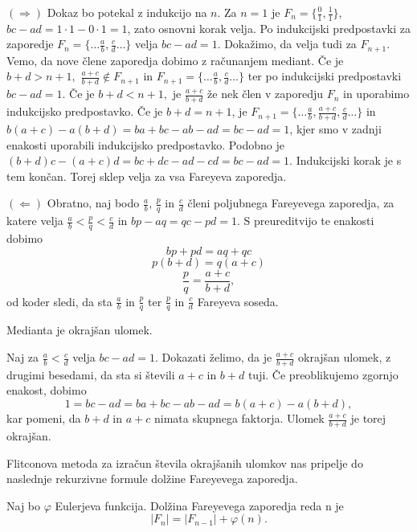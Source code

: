 \documentclass[mat1]{fmfdelo}
\begin{document}
\begin{dokaz}
$(\Rightarrow)$ Dokaz bo potekal z indukcijo na $n$.
Za $n=1$ je $F_n = \{\frac{0}{1}, \frac{1}{1}\}$, $bc - ad = 1\cdot1 - 0\cdot1 = 1$, zato osnovni korak velja.
Po indukcijski predpostavki za zaporedje \( F_n = \{\ldots \frac{a}{b}, \frac{c}{d} \ldots \} \) velja $bc - ad = 1$. Dokažimo, da velja tudi za $F_{n+1}$. Vemo, da nove člene zaporedja dobimo z računanjem mediant. Če je $b+d > n+1,$ $\frac{a+c}{b+d} \notin F_{n+1}$ in \( F_{n+1} = \{\ldots \frac{a}{b}, \frac{c}{d} \ldots \} \) ter po indukcijski predpostavki $bc - ad = 1$. 
Če je $b+d < n+1,$ je $\frac{a+c}{b+d}$ že nek člen v zaporedju $F_n$ in uporabimo indukcijsko predpostavko. 
Če je $b+d = n+1$, je \( F_{n+1} = \{\ldots \frac{a}{b}, \frac{a+c}{b+d}, \frac{c}{d} \ldots \} \) in $b(a + c) - a(b + d) = ba + bc - ab - ad = bc - ad = 1$, kjer smo v zadnji enakosti uporabili indukcijsko predpostavko. Podobno je $(b + d)c - (a + c)d = bc + dc - ad - cd = bc - ad = 1$. Indukcijski korak je s tem končan. Torej sklep velja za vsa Fareyeva zaporedja.

$(\Leftarrow)$ Obratno, naj bodo $\frac{a}{b}$, $\frac{p}{q}$ in $\frac{c}{d}$ členi poljubnega Fareyevega zaporedja, za katere velja $\frac{a}{b} <\frac{p}{q} < \frac{c}{d}$ in $bp - aq = qc - pd = 1$. S preureditvijo te enakosti dobimo
\[ bp + pd = aq + qc \]
\[ p(b + d) = q(a + c) \]
\[ \frac{p}{q} = \frac{a+c}{b+d}, \]
od koder sledi, da sta $\frac{a}{b}$ in $\frac{p}{q}$ ter $\frac{p}{q}$ in $\frac{c}{d}$ Fareyeva soseda.
\end{dokaz}

\begin{lema}
\label{lema:MediantaOkrUlom}
Medianta je okrajšan ulomek.
\end{lema}

\begin{dokaz}
Naj za $\frac{a}{b} < \frac{c}{d}$ velja $bc - ad = 1$. Dokazati želimo, da je $\frac{a+c}{b+d}$ okrajšan ulomek, z drugimi besedami, da sta si števili $a+c$ in $b+d$ tuji. Če preoblikujemo zgornjo enakost, dobimo 
\[ 1 = bc - ad = ba + bc - ab - ad = b(a + c) - a(b + d), \]
kar pomeni, da $b+d$ in $a+c$ nimata skupnega faktorja. Ulomek $\frac{a+c}{b+d}$ je torej okrajšan.
\end{dokaz}

%
Flitconova metoda za izračun števila okrajšanih ulomkov nas pripelje do naslednje rekurzivne formule dolžine Fareyevega zaporedja.

\begin{trditev}
\label{trd:DolzinaZap}
Naj bo $\varphi$ Eulerjeva funkcija. Dolžina Fareyevega zaporedja reda n je
\[  |F_{n}| = |F_{n-1}| + \varphi(n). \]
\end{trditev}
\end{document}

